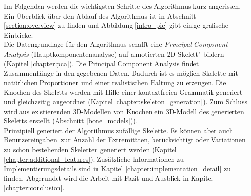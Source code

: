 Im Folgenden werden die wichtigsten Schritte des Algorithmus kurz angerissen. Ein Überblick über den Ablauf des Algorithmus ist in Abschnitt \ref{section:overview} zu finden und Abbildung \ref{intro_pic} gibt einige grafische Einblicke.\\
Die Datengrundlage für den Algorithmus schafft eine \emph{Principal Component Analysis} (Hauptkomponentenanalyse) auf annotierten 2D-Skelett"-bildern (Kapitel \ref{chapter:pca}). Die Principal Component Analysis findet Zusammenhänge in den gegebenen Daten. Dadurch ist es möglich Skelette mit natürlichen Proportionen und einer realistischen Haltung zu erzeugen.
Die Knochen des Skeletts werden mit Hilfe einer kontextfreien Grammatik generiert und gleichzeitig angeordnet (Kapitel \ref{chapter:skeleton_generation}). 
Zum Schluss wird aus existierenden 3D-Modellen von Knochen ein 3D-Modell des generierten Skeletts erstellt (Abschnitt \ref{bone_models})).\\
Prinzipiell generiert der Algorithmus zufällige Skelette. Es können aber auch Benutzereingaben, \zb zur Anzahl der Extremitäten, berücksichtigt oder Variationen zu schon bestehenden Skeletten generiert werden (Kapitel \ref{chapter:additional_features}).
Zusätzliche Informationen zu Implementierungsdetails sind in Kapitel \ref{chapter:implementation_detail} zu finden. Abgerundet wird die Arbeit mit Fazit und Ausblick in Kapitel \ref{chapter:conclusion}.


